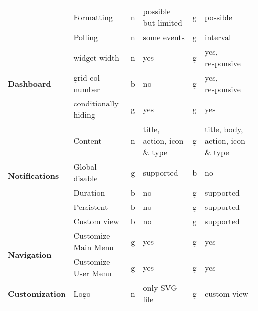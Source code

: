 \begin{table}[h!]
{\begin{tabular}{llclcl}
            & Formatting             & n           & possible but limited            & g           & possible                                 \\
            & Polling                & n           & some events                     & g           & interval                                 \\
            \hline
            \multirow{3}{*}{\textbf{Dashboard}}      & widget width           & n           & yes                             & g           & yes, responsive                          \\
            & grid col number        & b           & no                              & g           & yes, responsive                          \\
            & conditionally hiding   & g           & yes                             & g           & yes                                      \\
            \hline
            \multirow{5}{*}{\textbf{Notifications}}  & Content                & n           & title, action, icon \& type     & g           & title, body, action, icon \& type        \\
            & Global disable         & g           & supported                       & b           & no                                       \\
            & Duration               & b           & no                              & g           & supported                                \\
            & Persistent             & b           & no                              & g           & supported                                \\
            & Custom view            & b           & no                              & g           & supported                                \\
            \hline
            \multirow{2}{*}{\textbf{Navigation}}     & Customize Main Menu    & g           & yes                             & g           & yes                                      \\
            & Customize User Menu    & g           & yes                             & g           & yes                                      \\
            \hline
            \multirow{10}{*}{\textbf{Customization}} & Logo                   & n           & only SVG file                   & g           & custom view                              \\

\end{tabular}}
\end{table}
